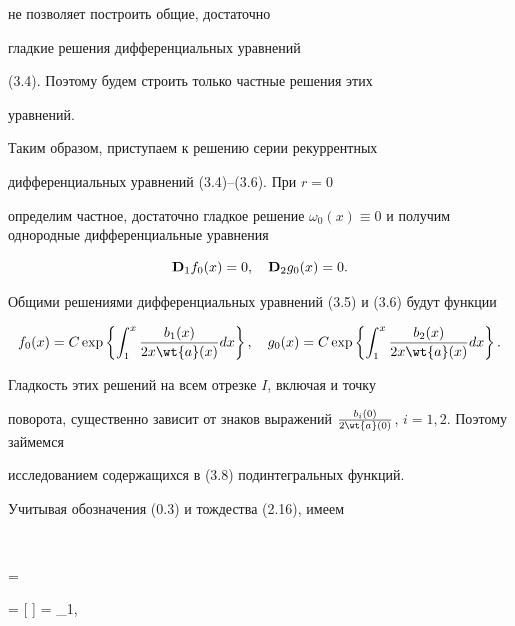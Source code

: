 не позволяет построить общие, достаточно


гладкие решения дифференциальных уравнений


(3.4). Поэтому будем строить только частные решения этих


уравнений.





Таким образом, приступаем к решению серии рекуррентных


дифференциальных уравнений (3.4)--(3.6). При $r = 0$


определим частное, достаточно гладкое решение $\omega_0 (x)


\equiv 0$ и получим однородные дифференциальные уравнения


\begin{equation}


\bold{D}_1 f_0 (x) = 0, \quad \bold{D}_2 g_0 (x) =0.


\end{equation}


Общими решениями дифференциальных уравнений (3.5) и (3.6) будут функции


\begin{equation}


f_0 (x) = C \exp \left\{ \int_1^x \frac{b_1 (x)}{2 x \wt{a }


(x)}d x\right\},\quad g_0 (x) = C \exp \left\{ \int_1^x


\frac{b_2 (x)}{2 x \wt{a } (x)}d x \right\}.


\end{equation}





Гладкость этих решений на всем отрезке $I$, включая и точку


поворота, существенно зависит от знаков выражений $\frac{b_i


(0)}{2 \wt{a } (0)}$, $i = 1,2$. Поэтому займемся


исследованием содержащихся в (3.8) подинтегральных функций.


Учитывая обозначения (0.3) и тождества (2.16), имеем


$$


 =




=  [ ] = \rho_1, \quad





